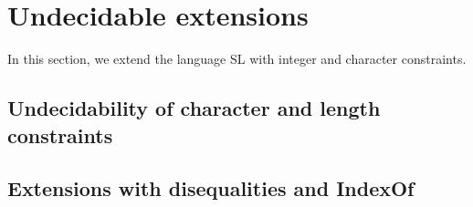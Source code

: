 
\section{Undecidable extensions}

In this section, we extend the language SL with integer and character constraints. 

\subsection{Undecidability of character and length constraints}

\subsection{Extensions with disequalities and IndexOf}